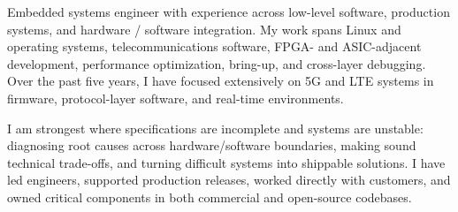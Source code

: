 \documentclass[11pt, a4paper]{awesome-cv}
\begin{document}
\makecvheader


Embedded systems engineer with experience across low-level software, production systems, and hardware / software integration. My work spans Linux and operating systems, telecommunications software, FPGA- and ASIC-adjacent development, performance optimization, bring-up, and cross-layer debugging.
Over the past five years, I have focused extensively on 5G and LTE systems in firmware, protocol-layer software, and real-time environments.

I am strongest where specifications are incomplete and systems are unstable: diagnosing root causes across hardware/software boundaries, making sound technical trade-offs, and turning difficult systems into shippable solutions. I have led engineers, supported production releases, worked directly with customers, and owned critical components in both commercial and open-source codebases.







\end{document}
